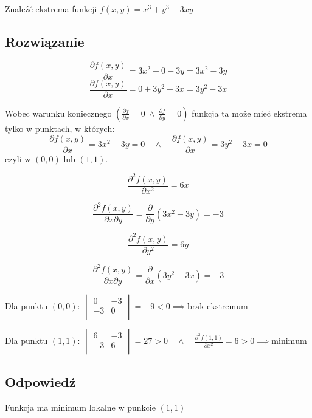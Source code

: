 \documentclass{article}
\newcommand{\partderiv}[2]{\frac{\partial #1}{\partial #2}}
\DeclareMathOperator{\?}{?}
\begin{document}
Znaleźć ekstrema funkcji $f(x,y) = x^3 + y^3 - 3xy$

\subsection*{Rozwiązanie}

\begin{equation*}
   \partderiv{f(x,y)}{x} = 3x^2 + 0 - 3y = 3x^2 - 3y
\end{equation*}
\begin{equation*}
   \partderiv{f(x,y)}{x} = 0 + 3y^2 - 3x = 3y^2 - 3x
\end{equation*}

Wobec warunku koniecznego $\left(\displaystyle \partderiv{f}{x} = 0 \ \land \ \partderiv{f}{y} = 0 \right)$
funkcja ta może mieć ekstrema tylko w punktach, w których:
\begin{equation*}
   \partderiv{f(x,y)}{x} = 3x^2 - 3y = 0
   \quad\land\quad
   \partderiv{f(x,y)}{x} = 3y^2 - 3x = 0
\end{equation*}
czyli w $(0,0)$ lub $(1,1)$.

\begin{multicols}{2}
   \noindent
   \begin{equation*}
      \frac{\partial^2 f(x,y)}{\partial x^2} = 6x
   \end{equation*}

   \begin{equation*}
      \frac{\partial^2 f(x,y)}{\partial x \partial y} = \partderiv{}{y}(3x^2 - 3y) = -3
   \end{equation*}

   \begin{equation*}
      \frac{\partial^2 f(x,y)}{\partial y^2} = 6y
   \end{equation*}

   \begin{equation*}
      \frac{\partial^2 f(x,y)}{\partial x \partial y} = \partderiv{}{x}(3y^2 - 3x) = -3
   \end{equation*}
\end{multicols}

\vspace{1em}
Dla punktu $(0,0)$:
$
\displaystyle
   \begin{vmatrix}
      0  & -3 \\
      -3  & 0 \\
   \end{vmatrix} = -9 < 0 \implies \textrm{brak ekstremum}
$

Dla punktu $(1,1)$:
$
\displaystyle
   \begin{vmatrix}
      6  & -3 \\
      -3  & 6 \\
   \end{vmatrix} = 27 > 0 \quad\land\quad \frac{\partial^2 f(1,1)}{\partial x^2} = 6 > 0 \implies \textrm{minimum}
$

\subsection*{Odpowiedź}

Funkcja ma minimum lokalne w punkcie $(1,1)$
\end{document}
